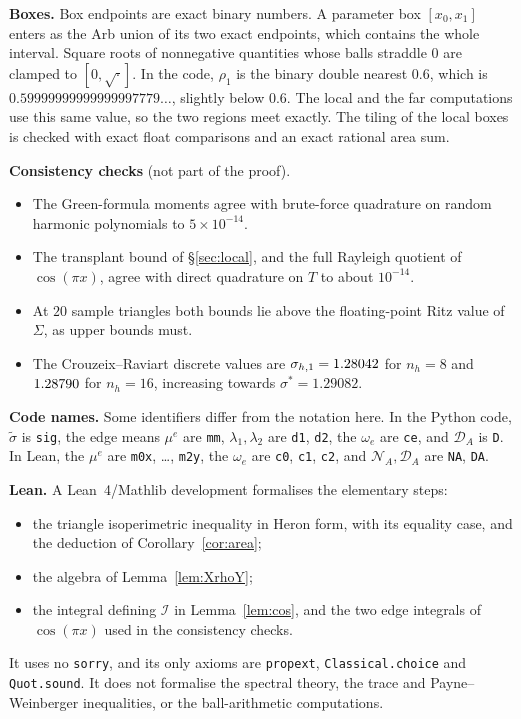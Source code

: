 \documentclass[11pt]{article}
\theoremstyle{definition}
\theoremstyle{remark}
\begin{document}
\textbf{Boxes.} Box endpoints are exact binary numbers. A parameter box $[x_0,x_1]$ enters as the Arb union of its two exact endpoints, which contains
the whole interval. Square roots of nonnegative quantities whose balls straddle $0$ are clamped to
$[0,\sqrt{\cdot}]$. In the code, $\rho_1$ is the binary double nearest $0.6$, which is
$0.59999999999999997779\ldots$, slightly below $0.6$. The local and the far computations use this same value,
so the two regions meet exactly. The tiling of the local boxes is checked with exact float comparisons and an
exact rational area sum.

\textbf{Consistency checks} (not part of the proof).
\begin{itemize}
\item The Green-formula moments agree with brute-force quadrature on random harmonic polynomials to
$5\times10^{-14}$.
\item The transplant bound of \S\ref{sec:local}, and the full Rayleigh quotient of $\cos(\pi x)$, agree with
direct quadrature on $T$ to about $10^{-14}$.
\item At $20$ sample triangles both bounds lie above the floating-point Ritz value of $\Sigma$, as upper
bounds must.
\item The Crouzeix--Raviart discrete values are $\sigma_{h,1}=1.28042$ for $n_h=8$ and $1.28790$ for
$n_h=16$, increasing towards $\sigma^*=1.29082$.
\end{itemize}

\textbf{Code names.} Some identifiers differ from the notation here. In the Python code, $\tilde\sigma$ is
\texttt{sig}, the edge means $\mu^e$ are \texttt{mm}, $\lambda_1,\lambda_2$ are \texttt{d1}, \texttt{d2},
the $\omega_e$ are \texttt{ce}, and $\mathcal D_A$ is \texttt{D}. In Lean, the $\mu^e$ are \texttt{m0x},
\dots, \texttt{m2y}, the $\omega_e$ are \texttt{c0}, \texttt{c1}, \texttt{c2}, and $\mathcal N_A,\mathcal D_A$
are \texttt{NA}, \texttt{DA}.

\textbf{Lean.} A Lean~4/Mathlib development formalises the elementary steps:
\begin{itemize}
\item the triangle isoperimetric inequality in Heron form, with its equality case, and the deduction of
Corollary~\ref{cor:area};
\item the algebra of Lemma~\ref{lem:XrhoY};
\item the integral defining $\mathcal I$ in Lemma~\ref{lem:cos}, and the two edge integrals of $\cos(\pi x)$ used in
the consistency checks.
\end{itemize}
It uses no \texttt{sorry}, and its only axioms are \texttt{propext}, \texttt{Classical.choice} and
\texttt{Quot.sound}. It does not formalise the spectral theory, the trace and Payne--Weinberger
inequalities, or the ball-arithmetic computations.
\end{document}
